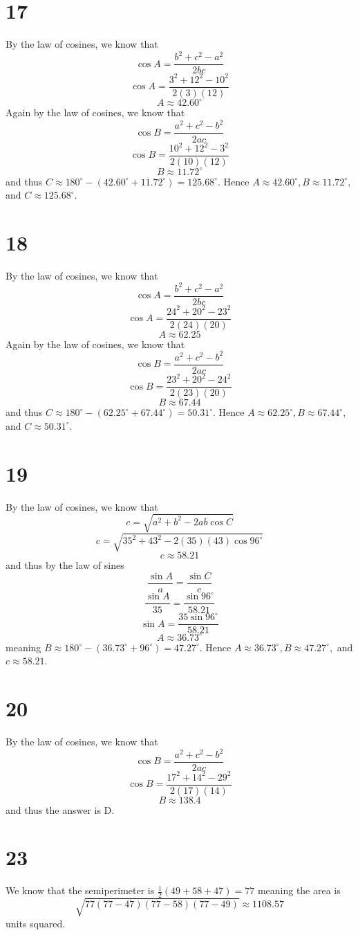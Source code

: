 \documentclass{article}
\theoremstyle{definition}
\newcommand{\?}{\stackrel{?}{=}}
\begin{document}
\section*{17}
By the law of cosines, we know that
\[ \cos A=\dfrac{b^2+c^2-a^2}{2bc} \]
\[ \cos A=\dfrac{3^2+12^2-10^2}{2(3)(12)} \]
\[ A\approx 42.60^\circ \]
Again by the law of cosines, we know that
\[ \cos B=\dfrac{a^2+c^2-b^2}{2ac} \]
\[ \cos B=\dfrac{10^2+12^2-3^2}{2(10)(12)} \]
\[ B\approx 11.72^\circ \] 
and thus $C\approx 180^\circ-(42.60^\circ+11.72^\circ)=125.68^\circ$. Hence
$A\approx 42.60^\circ,B\approx 11.72^\circ,$ and $C\approx 125.68^\circ$.

\section*{18}
By the law of cosines, we know that
\[ \cos A=\dfrac{b^2+c^2-a^2}{2bc} \]
\[ \cos A=\dfrac{24^2+20^2-23^2}{2(24)(20)} \]
\[ A\approx 62.25 \]
Again by the law of cosines, we know that
\[ \cos B=\dfrac{a^2+c^2-b^2}{2ac} \]
\[ \cos B=\dfrac{23^2+20^2-24^2}{2(23)(20)} \]
\[ B\approx 67.44 \]
and thus $C\approx 180^\circ-(62.25^\circ+67.44^\circ)=50.31^\circ$. Hence
$A\approx 62.25^\circ,B\approx 67.44^\circ,$ and $C\approx 50.31^\circ$.

\section*{19}
By the law of cosines, we know that
\[ c=\sqrt{a^2+b^2-2ab\cos C} \]
\[ c=\sqrt{35^2+43^2-2(35)(43)\cos 96^\circ} \]
\[ c\approx 58.21 \]
and thus by the law of sines
\[ \frac{\sin A}{a}=\frac{\sin C}{c} \]
\[ \frac{\sin A}{35}=\frac{\sin 96^\circ}{58.21} \]
\[ \sin A=\frac{35\sin 96^\circ}{58.21} \]
\[ A\approx 36.73^\circ \]
meaning $B\approx 180^\circ-(36.73^\circ+96^\circ)=47.27^\circ$. Hence
$A\approx 36.73^\circ,B\approx 47.27^\circ,$ and $c\approx 58.21$.

\section*{20}
By the law of cosines, we know that
\[ \cos B=\frac{a^2+c^2-b^2}{2ac} \]
\[ \cos B=\frac{17^2+14^2-29^2}{2(17)(14)} \]
\[ B\approx 138.4 \]
and thus the answer is D.

\section*{23}
We know that the semiperimeter is $\frac{1}{2}(49+58+47)=77$ meaning the area is
\[ \sqrt{77(77-47)(77-58)(77-49)}\approx 1108.57 \] units squared.
\end{document}
